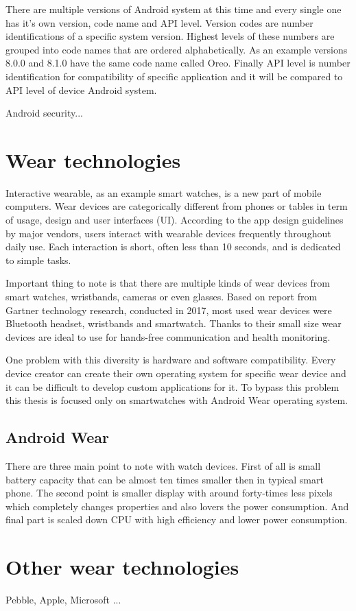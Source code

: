 There are multiple versions of Android system at this time and every single one has it's own version, code name and API level. Version codes are number identifications of a specific system version. Highest levels of these numbers are grouped into code names that are ordered alphabetically. As an example versions 8.0.0 and 8.1.0 have the same code name called Oreo. Finally API level is number identification for compatibility of specific application and it will be compared to API level of device Android system.\cite{AOSP}\cite{AD}

Android security...

\section{Wear technologies}\label{sec:WearTechnologies}
Interactive wearable, as an example smart watches, is a new part of mobile computers. Wear devices are categorically different from phones or tables in term of usage, design and user interfaces (UI). According to the app design guidelines by major vendors, users interact with wearable devices frequently throughout daily use. Each interaction is short, often less than 10 seconds, and is dedicated to simple tasks.\cite{UtCoAWO}

Important thing to note is that there are multiple kinds of wear devices from smart watches, wristbands, cameras or even glasses.\cite{MIWD} Based on report from Gartner technology research, conducted in 2017, most used wear devices were Bluetooth headset, wristbands and smartwatch. \cite{GSWWDS} Thanks to their small size wear devices are ideal to use for hands-free communication and health monitoring.

One problem with this diversity is hardware and software compatibility. Every device creator can create their own operating system for specific wear device and it can be difficult to develop custom applications for it. To bypass this problem this thesis is focused only on smartwatches with Android Wear operating system. 

\subsection{Android Wear}\label{sec:AndroidWear}
There are three main point to note with watch devices. First of all is small battery capacity that can be almost ten times smaller then in typical smart phone. The second point is smaller display with around forty-times less pixels which completely changes properties and also lovers the power consumption. And final part is scaled down CPU with high efficiency and lower power consumption.\cite{UtCoAWO}

\section{Other wear technologies}\label{sec:OtherWearTechnologies}
Pebble, Apple, Microsoft ...